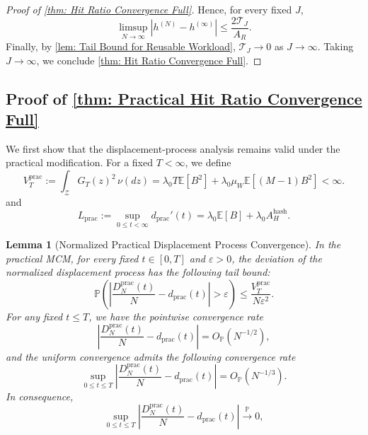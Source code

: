 \documentclass{article}
\newtheorem{lemma}[lemma]{Lemma}
\theoremstyle{definition}
\newcommand{\E}{\mathbb E}
\newcommand{\pro}{\mathbb P}
\begin{document}
\begin{proof}[Proof of \cref{thm: Hit Ratio Convergence Full}]
    Hence, for every fixed $J$,
    \begin{equation*}
        \limsup_{N\rightarrow\infty} \left|h ^{(N)} -h ^{(\infty)}  \right| \leq \frac{2\mathcal T_J}{A_R}.
    \end{equation*}
    Finally, by \cref{lem: Tail Bound for Reusable Workload}, $\mathcal T_J\rightarrow 0$ as $J\rightarrow\infty$. Taking $J\rightarrow\infty$, we conclude \cref{thm: Hit Ratio Convergence Full}.
\end{proof}

\subsection{Proof of \cref{thm: Practical Hit Ratio Convergence Full}}
\label{ssec: Proof of the Full Version of practical results}

We first show that the displacement-process analysis remains valid under the practical modification. For a fixed $T<\infty$, we define
\begin{equation*}
    V_T^{\mathrm{prac}}:=\int_{\mathcal Z}G_T(z)^2\,\nu(dz)=\lambda_0T\E[B^2]+\lambda_0\mu_W\E[(M-1)B^2]<\infty.
\end{equation*}
and
\begin{equation*}
    L_{\mathrm{prac}}:=\sup_{0\leq t < \infty}d_{\mathrm{prac}}'(t) =\lambda_0 \E[B]+\lambda_0 A_H^{\mathrm{hash}}.
\end{equation*}


\begin{lemma}[Normalized Practical Displacement Process Convergence]
\label{lem: Normalized Practical Displacement Process Convergence}
In the practical MCM, for every fixed $t\in[0,T]$ and $\varepsilon>0$, the deviation of the normalized displacement process has the following tail bound:
\begin{equation}
\label{equ: practical displacement pointwise concentration}
    \pro\left(\left|\frac{D_N^{\mathrm{prac}}(t)}{N}-d_{\mathrm{prac}}(t)\right|>\varepsilon\right) \leq\frac{V_T^{\mathrm{prac}}}{N\varepsilon^2}.
\end{equation}
For any fixed $t\leq T$, we have the pointwise convergence rate
\begin{equation}
\label{equ: practical displacement pointwise rate}
    \left|\frac{D_N^{\mathrm{prac}}(t)}{N}-d_{\mathrm{prac}}(t)\right|=O_{\mathbb P}(N^{-1/2}),
\end{equation}
and the uniform convergence admits the following convergence rate
\begin{equation}
\label{equ: practical displacement uniform rate}
    \sup_{0\leq t\leq T}\left|\frac{D_N^{\mathrm{prac}}(t)}{N}-d_{\mathrm{prac}}(t)\right|=O_{\mathbb P}(N^{-1/3}).
\end{equation}
In consequence,
\begin{equation}
\label{equ: practical displacement sample path convergence}
    \sup_{0\leq t\leq T}\left|\frac{D_N^{\mathrm{prac}}(t)}{N}-d_{\mathrm{prac}}(t)\right|\xrightarrow{\mathbb P}0,
\end{equation}

\end{lemma}
\end{document}
